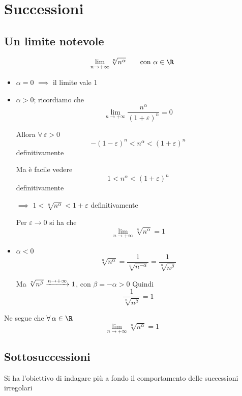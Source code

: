 
\section{Successioni}

\subsection{Un limite notevole}
\[
    \lim_{n\to +\infty} \sqrt[n]{n^{\alpha}}\qquad\text{con }\alpha \in \R
\]
\begin{itemize}
    \item $ \alpha = 0$ $\implies$ il limite vale 1
    \item $ \alpha >0 $; ricordiamo che \[
        \lim_{n\to +\infty} \frac{n^{\alpha}}{(1+ \varepsilon)^{n}} =0
    \]

    Allora $ \forall\, \varepsilon>0 $ \[
        -(1- \varepsilon)^{n}<n^{\alpha}<(1+ \varepsilon)^{n}
    \] definitivamente

    Ma è facile vedere \[
        1<n^{\alpha}<(1+ \varepsilon)^{n}
    \] definitivamente 
    
    $\implies$ $ 1<\sqrt[n]{n^{\alpha}}<1+ \varepsilon $ definitivamente

    Per $ \varepsilon\to 0 $ si ha che
    \[
        \lim_{n\to +\infty} \sqrt[n]{n^{\alpha}} =1
    \]
    \item $ \alpha < 0 $
    \[
        \sqrt[n]{n^{\alpha}}=\frac{1}{\sqrt[n]{n^{-\alpha}}}=\frac{1}{\sqrt[n]{n^{\beta}}}
    \]

    Ma $ \sqrt[n]{n^{\beta}} \xrightarrow{n\to +\infty} 1 \displaystyle$, con $ \beta =-\alpha>0 $
    Quindi \[
        \frac{1}{\sqrt[n]{n^{\beta}}}=1
    \]
\end{itemize}
Ne segue che $ \forall\, \alpha \in \R $
\[
    \lim_{n\to +\infty} \sqrt[n]{n^{\alpha}}=1
\]


\subsection{Sottosuccessioni}

Si ha l'obiettivo di indagare più a fondo il comportamento delle successioni irregolari


